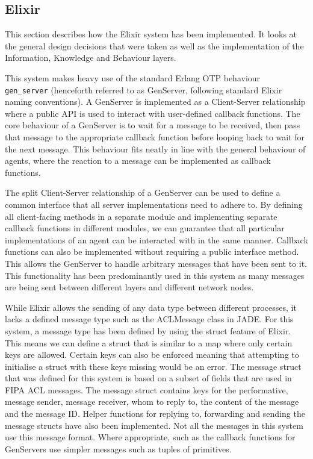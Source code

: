 \subsection{Elixir}

This section describes how the Elixir system has been implemented.
It looks at the general design decisions that were taken as well as the implementation of the Information, Knowledge and Behaviour layers.

This system makes heavy use of the standard Erlang OTP behaviour\\ \verb|gen_server| (henceforth referred to as GenServer, following standard Elixir naming conventions).
A GenServer is implemented as a Client-Server relationship where a public API is used to interact with user-defined callback functions.
The core behaviour of a GenServer is to wait for a message to be received, then pass that message to the appropriate callback function before looping back to wait for the next message.
This behaviour fits neatly in line with the general behaviour of agents, where the reaction to a message can be implemented as callback functions.

The split Client-Server relationship of a GenServer can be used to define a common interface that all server implementations need to adhere to.
By defining all client-facing methods in a separate module and implementing separate callback functions in different modules, we can guarantee that all particular implementations of an agent can be interacted with in the same manner.
Callback functions can also be implemented without requiring a public interface method.
This allows the GenServer to handle arbitrary messages that have been sent to it.
This functionality has been predominantly used in this system as many messages are being sent between different layers and different network nodes.

While Elixir allows the sending of any data type between different processes, it lacks a defined message type such as the ACLMessage class in JADE\@.
For this system, a message type has been defined by using the struct feature of Elixir.
This means we can define a struct that is similar to a map where only certain keys are allowed.
Certain keys can also be enforced meaning that attempting to initialise a struct with these keys missing would be an error.
The message struct that was defined for this system is based on a subset of fields that are used in FIPA ACL messages.
The message struct contains keys for the performative, message sender, message receiver, whom to reply to, the content of the message and the message ID\@.
Helper functions for replying to, forwarding and sending the message structs have also been implemented.
Not all the messages in this system use this message format.
Where appropriate, such as the callback functions for GenServers use simpler messages such as tuples of primitives.

